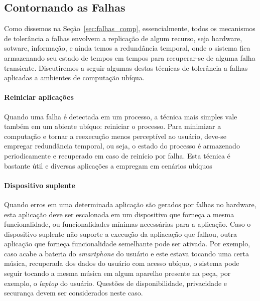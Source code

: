 
\subsection{Contornando as Falhas} %
\label{sub:contornando_as_falhas}

Como dissemos na Seção~\ref{sec:falhas_comp}, essencialmente, todos os mecanismos de tolerância a falhas envolvem a replicação de algum recurso, seja hardware, sotware, informação, e ainda temos a redundância temporal, onde o sistema fica armazenando seu estado de tempos em tempos para recuperar-se de alguma falha transiente. Discutiremos a seguir algumas destas técnicas de tolerância a falhas aplicadas a ambientes de computação ubíqua.

\paragraph{Reiniciar aplicações} %

Quando uma falha é detectada em um processo, a técnica mais simples vale também em um abiente ubíquo: reiniciar o processo. Para minimizar a computação e tornar a reexecução menos perceptível ao usuário, deve-se empregar redundância temporal, ou seja, o estado do processo é armazenado periodicamente e recuperado em caso de reinício por falha. Esta técnica é bastante útil e diversas aplicações a empregam em cenários ubíquos


\paragraph{Dispositivo suplente} %

Quando erros em uma determinada aplicação são gerados por falhas no hardware, esta aplicação deve ser escalonada em um dispositivo que forneça a mesma funcionalidade, ou funcionalidades mínimas necessárias para a aplicação. Caso o dispositivo suplente não suporte a execução da apliacação que falhou, outra aplicação que forneça funcionalidade semelhante pode ser ativada. Por exemplo, caso acabe a bateria do \emph{smartphone} do usuário e este estava tocando uma certa música, recuperada dos dados do usuário com acesso ubíquo, o sistema pode seguir tocando a mesma música em algum aparelho presente na peça, por exemplo, o \emph{laptop} do usuário. Questões de disponibilidade, privacidade e securança devem ser considerados neste caso.

